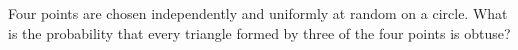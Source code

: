 Four points are chosen independently and uniformly at random on a circle. What is the probability that every triangle formed by three of the four points is obtuse?
